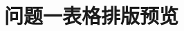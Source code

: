 \documentclass[UTF8,a4paper,zihao=-4,fontset=none]{ctexart}
\begin{document}
\section*{问题一表格排版预览}

\end{document}
